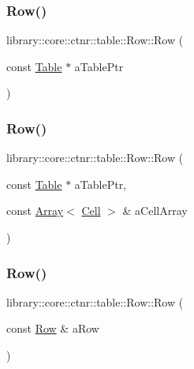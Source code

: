 \subsubsection{\texorpdfstring{Row()}{Row()}\hspace{0.1cm}{\footnotesize\ttfamily [3/5]}}
{\footnotesize\ttfamily library\+::core\+::ctnr\+::table\+::\+Row\+::\+Row (\begin{DoxyParamCaption}\item[{const \hyperlink{classlibrary_1_1core_1_1ctnr_1_1_table}{Table} $\ast$}]{a\+Table\+Ptr }\end{DoxyParamCaption})}

\mbox{\label{classlibrary_1_1core_1_1ctnr_1_1table_1_1_row_a5fdac640867ecc76f6c3dbf1bc043ef7}} 
\subsubsection{\texorpdfstring{Row()}{Row()}\hspace{0.1cm}{\footnotesize\ttfamily [4/5]}}
{\footnotesize\ttfamily library\+::core\+::ctnr\+::table\+::\+Row\+::\+Row (\begin{DoxyParamCaption}\item[{const \hyperlink{classlibrary_1_1core_1_1ctnr_1_1_table}{Table} $\ast$}]{a\+Table\+Ptr,  }\item[{const \hyperlink{classlibrary_1_1core_1_1ctnr_1_1_array}{Array}$<$ \hyperlink{namespacelibrary_1_1core_1_1ctnr_1_1table_aac6007d595b2967513e8e6b89f6092f5}{Cell} $>$ \&}]{a\+Cell\+Array }\end{DoxyParamCaption})}

\mbox{\label{classlibrary_1_1core_1_1ctnr_1_1table_1_1_row_aeed7c04310cf0bfa9b6448d623ab84c2}} 
\subsubsection{\texorpdfstring{Row()}{Row()}\hspace{0.1cm}{\footnotesize\ttfamily [5/5]}}
{\footnotesize\ttfamily library\+::core\+::ctnr\+::table\+::\+Row\+::\+Row (\begin{DoxyParamCaption}\item[{const \hyperlink{classlibrary_1_1core_1_1ctnr_1_1table_1_1_row}{Row} \&}]{a\+Row }\end{DoxyParamCaption})}



